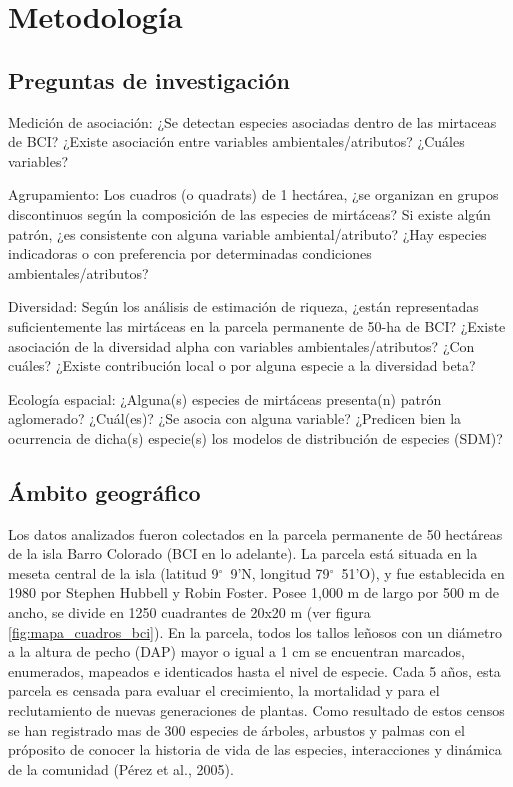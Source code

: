 \documentclass[11pt,]{article}
\begin{document}
\section{Metodología}\label{metodologuxeda}

\subsection{Preguntas de
investigación}\label{preguntas-de-investigaciuxf3n}

Medición de asociación: ¿Se detectan especies asociadas dentro de las
mirtaceas de BCI? ¿Existe asociación entre variables
ambientales/atributos? ¿Cuáles variables?

Agrupamiento: Los cuadros (o quadrats) de 1 hectárea, ¿se organizan en
grupos discontinuos según la composición de las especies de mirtáceas?
Si existe algún patrón, ¿es consistente con alguna variable
ambiental/atributo? ¿Hay especies indicadoras o con preferencia por
determinadas condiciones ambientales/atributos?

Diversidad: Según los análisis de estimación de riqueza, ¿están
representadas suficientemente las mirtáceas en la parcela permanente de
50-ha de BCI? ¿Existe asociación de la diversidad alpha con variables
ambientales/atributos? ¿Con cuáles? ¿Existe contribución local o por
alguna especie a la diversidad beta?

Ecología espacial: ¿Alguna(s) especies de mirtáceas presenta(n) patrón
aglomerado? ¿Cuál(es)? ¿Se asocia con alguna variable? ¿Predicen bien la
ocurrencia de dicha(s) especie(s) los modelos de distribución de
especies (SDM)?

\subsection{Ámbito geográfico}\label{uxe1mbito-geogruxe1fico}

Los datos analizados fueron colectados en la parcela permanente de 50
hectáreas de la isla Barro Colorado (BCI en lo adelante). La parcela
está situada en la meseta central de la isla (latitud 9\(^\circ\)~9'N,
longitud 79\(^\circ\)~51'O), y fue establecida en 1980 por Stephen
Hubbell y Robin Foster. Posee 1,000 m de largo por 500 m de ancho, se
divide en 1250 cuadrantes de 20x20 m (ver figura
\ref{fig:mapa_cuadros_bci}). En la parcela, todos los tallos leñosos con
un diámetro a la altura de pecho (DAP) mayor o igual a 1 cm se
encuentran marcados, enumerados, mapeados e identicados hasta el nivel
de especie. Cada 5 años, esta parcela es censada para evaluar el
crecimiento, la mortalidad y para el reclutamiento de nuevas
generaciones de plantas. Como resultado de estos censos se han
registrado mas de 300 especies de árboles, arbustos y palmas con el
próposito de conocer la historia de vida de las especies, interacciones
y dinámica de la comunidad (Pérez et al., 2005).
\end{document}
